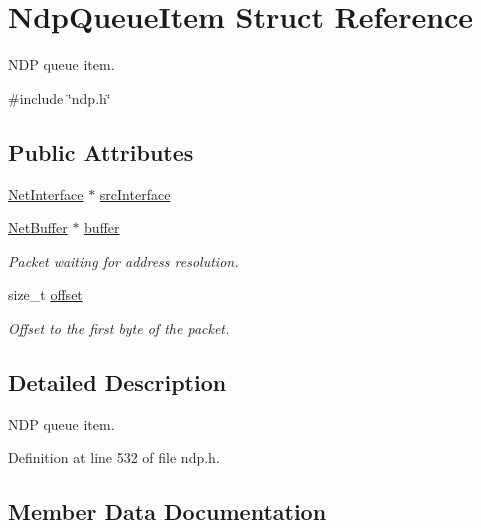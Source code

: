 \hypertarget{structNdpQueueItem}{}\section{Ndp\+Queue\+Item Struct Reference}
\label{structNdpQueueItem}


N\+DP queue item.  




{\ttfamily \#include \char`\"{}ndp.\+h\char`\"{}}

\subsection*{Public Attributes}
\begin{DoxyCompactItemize}
\item 
\hyperlink{net_8h_a2234db8911a1148c9159979d8f5e0d6b}{Net\+Interface} $\ast$ \hyperlink{structNdpQueueItem_ae42a51fd4d60583ddc7a323c9e2c6863}{src\+Interface}
\item 
\hyperlink{structNetBuffer}{Net\+Buffer} $\ast$ \hyperlink{structNdpQueueItem_a082af3807557108029732db38c0343e6}{buffer}
\begin{DoxyCompactList}\small\item\em Packet waiting for address resolution. \end{DoxyCompactList}\item 
size\+\_\+t \hyperlink{structNdpQueueItem_a35dd0104a5c90df40b99e85e84b2e194}{offset}
\begin{DoxyCompactList}\small\item\em Offset to the first byte of the packet. \end{DoxyCompactList}\end{DoxyCompactItemize}


\subsection{Detailed Description}
N\+DP queue item. 

Definition at line 532 of file ndp.\+h.



\subsection{Member Data Documentation}
\mbox{\label{structNdpQueueItem_a082af3807557108029732db38c0343e6}} 
